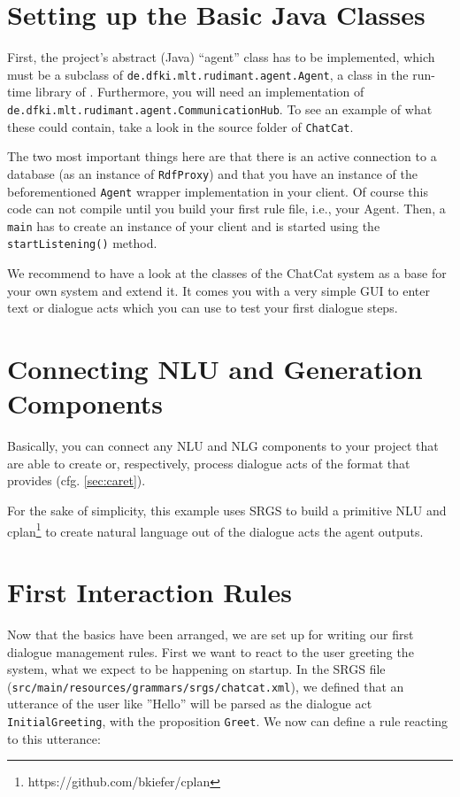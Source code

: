 \section{Setting up the Basic Java Classes}

First, the project's abstract (Java) ``agent'' class has to be implemented,
which must be a subclass of \texttt{de.dfki.mlt.rudimant.agent.Agent}, a class
in the run-time library of \vonda. Furthermore, you will need an implementation
of \texttt{de.dfki.mlt.rudimant.agent.CommunicationHub}. To see an example of
what these could contain, take a look in the source folder of \texttt{ChatCat}.

The two most important things here are that there is an active connection to a
database (as an instance of \texttt{RdfProxy}) and that you have an instance of
the beforementioned \vonda \texttt{Agent} wrapper implementation in your
client. Of course this code can not compile until you build your first rule
file, i.e., your \vonda Agent. Then, a \texttt{main} has to create an instance
of your client and is started using the \texttt{startListening()} method.

We recommend to have a look at the classes of the ChatCat system as a base for
your own system and extend it. It comes you with a very simple GUI to enter
text or dialogue acts which you can use to test your first dialogue steps.

\section{Connecting NLU and Generation Components}

Basically, you can connect any NLU and NLG components to your project that are
able to create or, respectively, process dialogue acts of the format that
\vonda provides (cfg. \ref{sec:caret}).

For the sake of simplicity, this example uses SRGS to build a primitive NLU and
cplan\footnote{https://github.com/bkiefer/cplan} to create natural language out of the dialogue acts the agent outputs.

\section{First Interaction Rules}

Now that the basics have been arranged, we are set up for writing our first
dialogue management rules. First we want to react to the user greeting the
system, what we expect to be happening on startup. In the SRGS file
(\small\texttt{src/main/resources/grammars/srgs/chatcat.xml}), we defined that
an utterance of the user like ''Hello'' will be parsed as the dialogue act
\texttt{InitialGreeting}, with the proposition \texttt{Greet}. We now can
define a rule reacting to this utterance:

